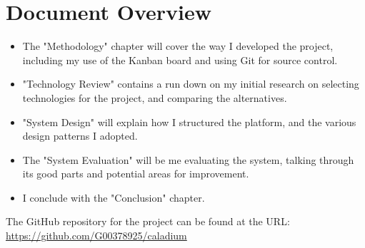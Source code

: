 \section{Document Overview}
\begin{itemize}
  \item The "Methodology" chapter will cover the way I developed the project,
  including my use of the Kanban board and using Git for source control.
  \item "Technology Review" contains a run down on my initial research on selecting
  technologies for the project, and comparing the alternatives.
  \item "System Design" will explain how I structured the platform,
  and the various design patterns I adopted.
  \item The "System Evaluation" will be me evaluating the system,
  talking through its good parts and potential areas for improvement.
  \item I conclude with the "Conclusion" chapter.
\end{itemize}

The GitHub repository for the project can be found at the URL: \\
\href{https://github.com/G00378925/caladium}{https://github.com/G00378925/caladium}